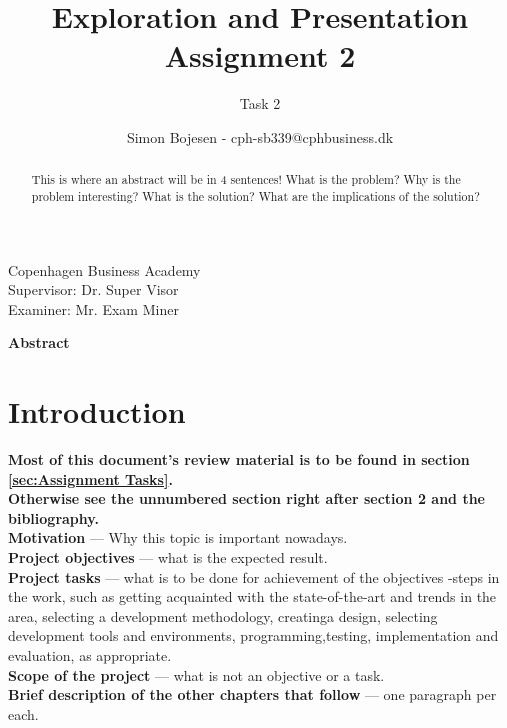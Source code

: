 \documentclass[
english, %
headsepline, %
]{scrartcl} %
\begin{document}
\begin{titlepage}
\title{Exploration and Presentation Assignment 2}
\author{Simon Bojesen - cph-sb339@cphbusiness.dk}
\subtitle{Task 2}
\maketitle
\begin{center}
    \large
        Copenhagen Business Academy\\
        Supervisor: Dr. Super Visor\\
        Examiner: Mr. Exam Miner
\end{center}

\thispagestyle{empty}

\end{titlepage}
\clearpage

\Large
    \textbf{Abstract}
    \begin{abstract}
        \label{sec:abstract}
        This is where an abstract will be in 4 sentences! What is the problem? Why is the problem interesting? What is the solution? 
        What are the implications of the solution?
    \end{abstract}
\normalsize  
\clearpage

\section{Introduction}
\label{sec:introduction} %
    \textbf{Most of this document's review material is to be found in section \ref{sec:Assignment Tasks}.
    \\    
    Otherwise see the unnumbered section right after section 2 and the bibliography.}\\ 
    \textbf{Motivation} — Why this topic is important nowadays.\\
    \textbf{Project objectives} — what is the expected result.\\
    \textbf{Project tasks} — what is to be done for achievement of the objectives -steps  in  the  work, 
        such  as  getting  acquainted  with  the  state-of-the-art and  trends  in  the  area,  
        selecting  a  development  methodology,  creatinga  design,  selecting  development  tools  and  environments,  
        programming,testing, implementation and evaluation, as appropriate.\\
    \textbf{Scope of the project} — what is not an objective or a task.\\
    \textbf{Brief description of the other chapters that follow} — one paragraph per each.
\clearpage
\end{document}
